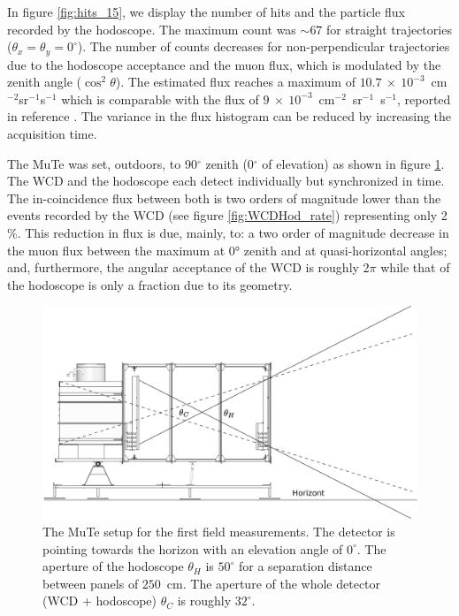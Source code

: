 \documentclass[letterpaper,11pt]{article}
\begin{document}
In figure \ref{fig:hits_15}, we display the number of hits and the particle flux recorded by the hodoscope. The maximum count was $\sim 67$ for straight trajectories ($\theta_x=\theta_y=0^{\circ}$). The number of counts decreases for non-perpendicular trajectories due to the hodoscope acceptance and the muon flux, which is modulated by the zenith angle ($\cos^2 \theta$). The estimated flux reaches a maximum of $10.7~\times~10^{-3}$~cm$^{-2}$sr$^{-1}$s$^{-1}$ which is comparable with the flux of $9~\times~10^{-3}$~cm$^{-2}$~sr$^{-1}$~s$^{-1}$, reported in reference \cite{Lesparre2012} . The variance in the flux histogram can be reduced by increasing the acquisition time.

The MuTe was set, outdoors, to 90$^{\circ}$ zenith (0$^{\circ}$ of elevation) as shown in figure \ref{fig:WCDHod}. The WCD and the hodoscope each detect individually but synchronized in time. The in-coincidence flux between both is two orders of magnitude lower than the events recorded by the WCD (see figure \ref{fig:WCDHod_rate}) representing only 2$\%$. This reduction in flux is due, mainly, to:
a two order of magnitude decrease in the muon  flux between the maximum at 0° zenith and at quasi-horizontal angles;  and, furthermore, the angular acceptance of the WCD is roughly 2$\pi$ while that of the hodoscope is only a fraction due to its geometry.


\begin{figure}[htb]
\centering
\includegraphics[width=0.7\columnwidth]{Figures/Acceptance.eps}
\caption{The MuTe setup for the first field measurements. The detector is pointing towards the horizon with an elevation angle of $0^{\circ}$. The aperture of the hodoscope $\theta_H$ is $50^{\circ}$ for a separation distance between panels of $250$~cm. The aperture of the whole detector (WCD + hodoscope) $\theta_C$ is roughly $32^{\circ}$.}
\label{fig:WCDHod}
\end{figure}
\end{document}
